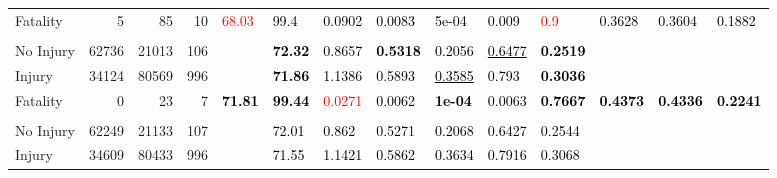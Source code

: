 \documentclass[]{elsarticle} %
\begin{document}
\begin{table}
{{\begin{tabular}[t]{lrrrllllllllll}
Fatality & 5 & 85 & 10 & \multirow{-3}{*}{\raggedright\arraybackslash \textcolor{red}{68.03}} & \textcolor{black}{99.4} & \textcolor{black}{0.0902} & \textcolor{black}{0.0083} & \textcolor{black}{5e-04} & \textcolor{black}{0.009} & \textcolor{red}{0.9} & \multirow{-3}{*}{\raggedright\arraybackslash \textcolor{black}{0.3628}} & \multirow{-3}{*}{\raggedright\arraybackslash \textcolor{black}{0.3604}} & \multirow{-3}{*}{\raggedright\arraybackslash \textcolor{black}{0.1882}}\\
\cmidrule{1-14}
\addlinespace[0.3em]
\multicolumn{14}{l}{\textbf{Model 2}}\\
\hspace{1em}No Injury & 62736 & 21013 & 106 &  & \textcolor{black}{\textbf{72.32}} & \textcolor{black}{0.8657} & \textcolor{black}{\textbf{0.5318}} & \textcolor{black}{0.2056} & \textcolor{black}{\underline{0.6477}} & \textcolor{black}{\textbf{0.2519}} &  &  & \\

\hspace{1em}Injury & 34124 & 80569 & 996 &  & \textcolor{black}{\textbf{71.86}} & \textcolor{black}{1.1386} & \textcolor{black}{0.5893} & \textcolor{black}{\underline{0.3585}} & \textcolor{black}{0.793} & \textcolor{black}{\textbf{0.3036}} &  &  & \\

Fatality & 0 & 23 & 7 & \multirow{-3}{*}{\raggedright\arraybackslash \textcolor{black}{\textbf{71.81}}} & \textcolor{black}{\textbf{99.44}} & \textcolor{red}{0.0271} & \textcolor{black}{0.0062} & \textcolor{black}{\textbf{1e-04}} & \textcolor{black}{0.0063} & \textcolor{black}{\textbf{0.7667}} & \multirow{-3}{*}{\raggedright\arraybackslash \textcolor{black}{\textbf{0.4373}}} & \multirow{-3}{*}{\raggedright\arraybackslash \textcolor{black}{\textbf{0.4336}}} & \multirow{-3}{*}{\raggedright\arraybackslash \textcolor{black}{\textbf{0.2241}}}\\
\cmidrule{1-14}
\addlinespace[0.3em]
\multicolumn{14}{l}{\textbf{Model 3}}\\
\hspace{1em}No Injury & 62249 & 21133 & 107 &  & \textcolor{black}{72.01} & \textcolor{black}{0.862} & \textcolor{black}{0.5271} & \textcolor{black}{0.2068} & \textcolor{black}{0.6427} & \textcolor{black}{0.2544} &  &  & \\

\hspace{1em}Injury & 34609 & 80433 & 996 &  & \textcolor{black}{71.55} & \textcolor{black}{1.1421} & \textcolor{black}{0.5862} & \textcolor{black}{0.3634} & \textcolor{black}{0.7916} & \textcolor{black}{0.3068} &  &  & \\


\end{tabular}}}
\end{table}
\end{document}
